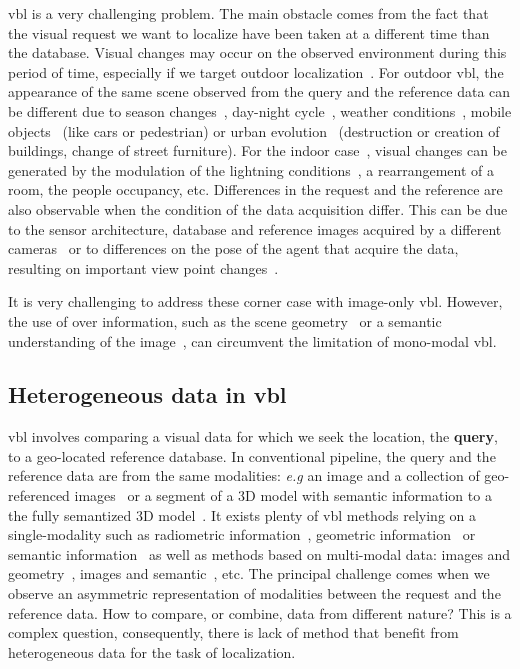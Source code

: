 	\Ac{vbl} is a very challenging problem. The main obstacle comes from the fact that the visual request we want to localize have been taken at a different time than the database. Visual changes may occur on the observed environment during this period of time, especially if we target outdoor localization~\citep{Lowry2016, Sattler2017a}. For outdoor \ac{vbl}, the appearance of the same scene observed from the query and the reference data can be different due to season changes~\citep{Krajnik2017a}, day-night cycle~\citep{Porav2018}, weather conditions~\citep{Porav2019}, mobile objects~\citep{Toft2018} (like cars or pedestrian) or urban evolution~\citep{Saha2018} (\eg destruction or creation of buildings, change of street furniture). For the indoor case~\citep{Taira2018}, visual changes can be generated by the modulation of the lightning conditions~\citep{Lu2016}, a rearrangement of a room, the people occupancy, etc. Differences in the request and the reference are also observable when the condition of the data acquisition differ. This can be due to the sensor architecture, \eg database and reference images acquired by a different cameras~\citep{Middelberg2014, Majdik2013} or to differences on the pose of the agent that acquire the data, resulting on important view point changes~\citep{Majdik2013, Torii2011, Lin2013, Vo2016, Tian2017}.
	
	It is very challenging to address these corner case with image-only \ac{vbl}. However, the use of over information, such as the scene geometry~\citep{Uy2018, Yew2018} or a semantic understanding of the image~\citep{Weinzaepfel2019}, can circumvent the limitation of mono-modal \ac{vbl}.
		
\subsection{Heterogeneous data in \acs{vbl}}
	\Ac{vbl} involves comparing a visual data for which we seek the location, the \textbf{query}, to a geo-located reference database. In conventional pipeline, the query and the reference data are from the same modalities: \textit{e.g} an image and a collection of geo-referenced images~\citep{Arandjelovic2014, Arandjelovic2017} or a segment of a 3D model with semantic information to a the fully semantized 3D model~\citep{Schonberger2017a}. It exists plenty of \ac{vbl} methods relying on a single-modality such as radiometric information~\citep{Liu2018, Radenovic2017}, geometric information~\citep{Uy2018, Yew2018} or semantic information~\citep{Ardeshir2014} as well as methods based on multi-modal data: images and geometry~\citep{Schonberger2017a}, images and semantic~\citep{Arandjelovic2014a}, etc. The principal challenge comes when we observe an asymmetric representation of modalities between the request and the reference data. How to compare, or combine, data from different nature? This is a complex question, consequently, there is lack of method that benefit from heterogeneous data for the task of localization.

